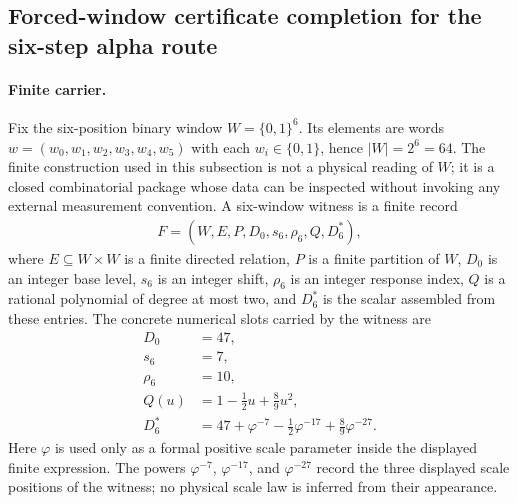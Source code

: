 
\subsection{Forced-window certificate completion for the six-step alpha route}
\label{sec:window6-alpha-certificate-completion-external-readout-theorem}

\paragraph{Finite carrier.}
Fix the six-position binary window
$W=\{0,1\}^6$.  Its elements are words $w=(w_0,w_1,w_2,w_3,w_4,w_5)$ with each $w_i\in\{0,1\}$, hence $|W|=2^6=64$.  The finite construction used in this subsection is not a physical reading of $W$; it is a closed combinatorial package whose data can be inspected without invoking any external measurement convention.  A six-window witness is a finite record
$$
\begin{aligned}
F=(W,E,P,D_0,s_6,\rho_6,Q,D_6^\ast),
\end{aligned}
$$
where $E\subseteq W\times W$ is a finite directed relation, $P$ is a finite partition of $W$, $D_0$ is an integer base level, $s_6$ is an integer shift, $\rho_6$ is an integer response index, $Q$ is a rational polynomial of degree at most two, and $D_6^\ast$ is the scalar assembled from these entries.  The concrete numerical slots carried by the witness are
$$
\begin{aligned}
D_0&=47,\\
s_6&=7,\\
\rho_6&=10,\\
Q(u)&=1-\frac{1}{2}u+\frac{8}{9}u^2,\\
D_6^\ast&=47+\varphi^{-7}-\frac{1}{2}\varphi^{-17}+\frac{8}{9}\varphi^{-27}.
\end{aligned}
$$
Here $\varphi$ is used only as a formal positive scale parameter inside the displayed finite expression.  The powers $\varphi^{-7}$, $\varphi^{-17}$, and $\varphi^{-27}$ record the three displayed scale positions of the witness; no physical scale law is inferred from their appearance.

